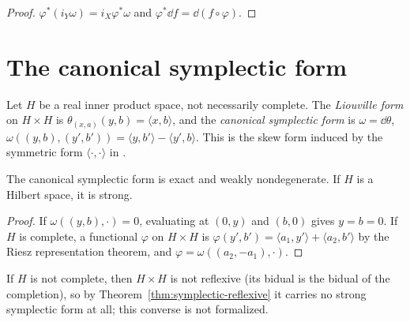 \begin{proof}
  \leanok
  $\varphi^*(i_Y\omega) = i_X \varphi^*\omega$ and $\varphi^* \dd f = \dd(f \circ \varphi)$.
\end{proof}

\section{The canonical symplectic form}

\begin{definition}
  \label{def:canonical-symplectic}
  \leanok
  Let $H$ be a real inner product space, not necessarily complete. The \emph{Liouville form} on
  $H \times H$ is $\theta_{(x, a)}(y, b) = \langle x, b \rangle$, and the \emph{canonical
  symplectic form} is
  $\omega = \dd\theta$, $\omega((y, b), (y', b')) = \langle y, b' \rangle - \langle y', b \rangle$.
  This is the skew form induced by the symmetric form $\langle \cdot, \cdot \rangle$
  in \cite[p.~590]{Mar72}.
\end{definition}

\begin{proposition}
  \label{prop:canonical-symplectic}
  \leanok
  The canonical symplectic form is exact and weakly nondegenerate. If $H$ is a Hilbert space, it
  is strong.
\end{proposition}

\begin{proof}
  \leanok
  If $\omega((y, b), \cdot) = 0$, evaluating at $(0, y)$ and $(b, 0)$ gives $y = b = 0$. If $H$
  is complete, a functional $\varphi$ on $H \times H$ is
  $\varphi(y', b') = \langle a_1, y' \rangle + \langle a_2, b' \rangle$ by the Riesz
  representation theorem, and $\varphi = \omega((a_2, -a_1), \cdot)$.
\end{proof}

If $H$ is not complete, then $H \times H$ is not reflexive (its bidual is the bidual of the
completion), so by Theorem~\ref{thm:symplectic-reflexive} it carries no strong symplectic form
at all; this converse is not formalized.
